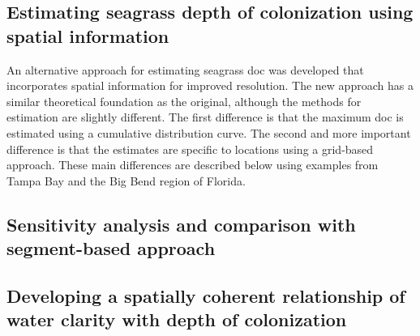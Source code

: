 \documentclass[letterpaper,12pt]{article}\usepackage[]{graphicx}\usepackage[]{color}
\begin{document}
\subsection{Estimating seagrass depth of colonization using spatial information}

An alternative approach for estimating seagrass \ac{doc} was developed that incorporates spatial information for improved resolution.  The new approach has a similar theoretical foundation as the original, although the methods for estimation are slightly different.  The first difference is that the maximum \ac{doc} is estimated using a cumulative distribution curve.  The second and more important difference is that the estimates are specific to locations using a grid-based approach.  These main differences are described below using examples from Tampa Bay and the Big Bend region of 
Florida.                                  

\subsection{Sensitivity analysis and comparison with segment-based approach}

\subsection{Developing a spatially coherent relationship of water clarity with depth of colonization}

\clearpage
\end{document}
